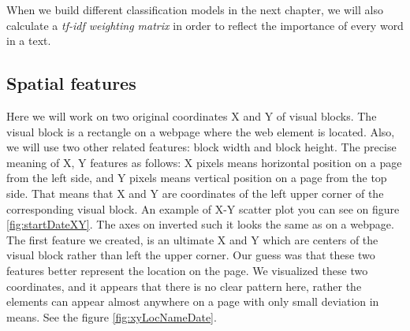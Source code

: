 When we build different classification models in the next chapter, we will also calculate a \textit{tf-idf weighting matrix} in order to reflect the importance of every word in a text.

\subsection{Spatial features}

Here we will work on two original coordinates X and Y of visual blocks. The visual block is a rectangle on a webpage where the web element is located. Also, we will use two other related features: block width and block height. The precise meaning of X, Y features as follows: X pixels means horizontal position on a page from the left side, and Y pixels means vertical position on a page from the top side. That means that X and Y are coordinates of the left upper corner of the corresponding visual block. An example of X-Y scatter plot you can see on figure \ref{fig:startDateXY}. The axes on inverted such it looks the same as on a webpage.\\

The first feature we created, is an ultimate X and Y which are centers of the visual block rather than left the upper corner. Our guess was that these two features better represent the location on the page. We visualized these two coordinates, and it appears that there is no clear pattern here, rather the elements can appear almost anywhere on a page with only small deviation in means. See the figure \ref{fig:xyLocNameDate}.\\


